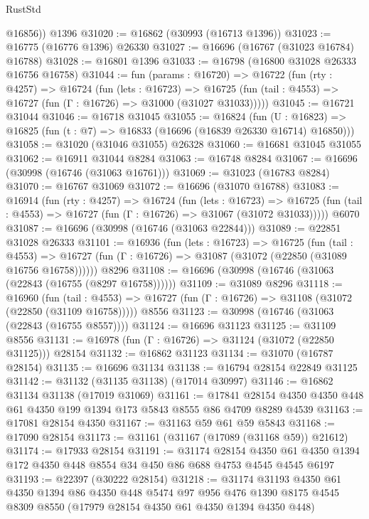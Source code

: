 \begin{lexlean}{RustStd}
\begin{coremodule}
        @16856))
    @1396
@31020 := @16862 (@30993 (@16713 @1396))
@31023 := @16775 (@16776 @1396) @26330
@31027 := @16696 (@16767 (@31023 @16784) @16788)
@31028 := @16801 @1396
@31033 := @16798 (@16800 @31028 @26333 @16756 @16758)
@31044 := fun (params : @16720) =>
  @16722
    (fun (rty : @4257) =>
    @16724
      (fun (lets : @16723) =>
      @16725 (fun (tail : @4553) => @16727 (fun (Γ : @16726) => @31000 (@31027 @31033)))))
@31045 := @16721 @31044
@31046 := @16718 @31045
@31055 := @16824
    (fun (U : @16823) => @16825 (fun (t : @7) => @16833 (@16696 (@16839 @26330 @16714) @16850)))
@31058 := @31020 (@31046 @31055) @26328
@31060 := @16681 @31045 @31055
@31062 := @16911 @31044 @8284
@31063 := @16748 @8284
@31067 := @16696 (@30998 (@16746 (@31063 @16761)))
@31069 := @31023 (@16783 @8284)
@31070 := @16767 @31069
@31072 := @16696 (@31070 @16788)
@31083 := @16914
    (fun (rty : @4257) =>
    @16724
      (fun (lets : @16723) =>
      @16725 (fun (tail : @4553) => @16727 (fun (Γ : @16726) => @31067 (@31072 @31033)))))
    @6070
@31087 := @16696 (@30998 (@16746 (@31063 @22844)))
@31089 := @22851 @31028 @26333
@31101 := @16936
    (fun (lets : @16723) =>
    @16725
      (fun (tail : @4553) =>
      @16727 (fun (Γ : @16726) => @31087 (@31072 (@22850 (@31089 @16756 @16758))))))
    @8296
@31108 := @16696 (@30998 (@16746 (@31063 (@22843 (@16755 (@8297 @16758))))))
@31109 := @31089 @8296
@31118 := @16960
    (fun (tail : @4553) => @16727 (fun (Γ : @16726) => @31108 (@31072 (@22850 (@31109 @16758)))))
    @8556
@31123 := @30998 (@16746 (@31063 (@22843 (@16755 @8557))))
@31124 := @16696 @31123
@31125 := @31109 @8556
@31131 := @16978 (fun (Γ : @16726) => @31124 (@31072 (@22850 @31125))) @28154
@31132 := @16862 @31123
@31134 := @31070 (@16787 @28154)
@31135 := @16696 @31134
@31138 := @16794 @28154 @22849 @31125
@31142 := @31132 (@31135 @31138) (@17014 @30997)
@31146 := @16862 @31134 @31138 (@17019 @31069)
@31161 := @17841 @28154 @4350 @4350 @448 @61 @4350 @199 @1394 @173 @5843 @8555 @86 @4709 @8289 @4539
@31163 := @17081 @28154 @4350
@31167 := @31163 @59 @61 @59 @5843
@31168 := @17090 @28154
@31173 := @31161 (@31167 (@17089 (@31168 @59)) @21612)
@31174 := @17933 @28154
@31191 := @31174
    @28154
    @4350
    @61
    @4350
    @1394
    @172
    @4350
    @448
    @8554
    @34
    @450
    @86
    @688
    @4753
    @4545
    @4545
    @6197
@31193 := @22397 (@30222 @28154)
@31218 := @31174
    @31193
    @4350
    @61
    @4350
    @1394
    @86
    @4350
    @448
    @5474
    @97
    @956
    @476
    @1390
    @8175
    @4545
    @8309
    @8550
    (@17979 @28154 @4350 @61 @4350 @1394 @4350 @448)

\end{coremodule}
\end{lexlean}
